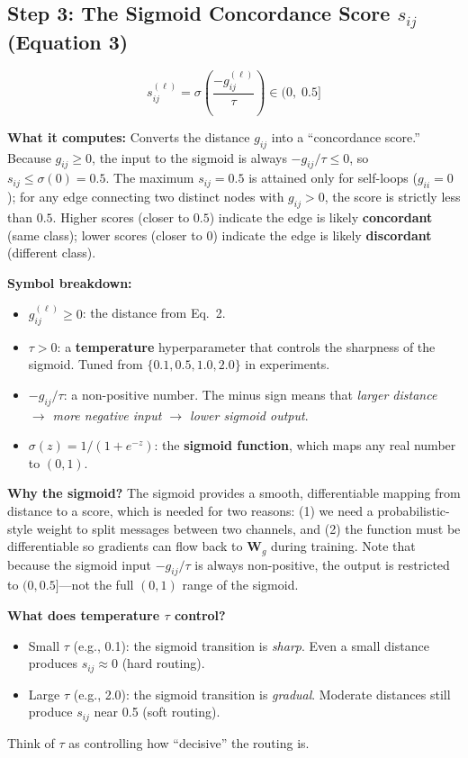 \documentclass[11pt,a4paper]{article}
\newcommand{\bW}{\mathbf{W}}
\theoremstyle{definition}
\theoremstyle{plain}
\begin{document}
\subsection{Step 3: The Sigmoid Concordance Score $s_{ij}$ (Equation 3)}
\label{sec:concordance}

\begin{equation}
  s_{ij}^{(\ell)} = \sigma\!\left(\frac{-g_{ij}^{(\ell)}}{\tau}\right) \in (0,\; 0.5]
  \tag{Eq.~3}
\end{equation}

\textbf{What it computes:}
Converts the distance $g_{ij}$ into a ``concordance score.''
Because $g_{ij} \geq 0$, the input to the sigmoid is always $-g_{ij}/\tau \leq 0$,
so $s_{ij} \leq \sigma(0) = 0.5$.
The maximum $s_{ij} = 0.5$ is attained only for self-loops ($g_{ii} = 0$);
for any edge connecting two distinct nodes with $g_{ij} > 0$, the score is strictly
less than $0.5$.
Higher scores (closer to $0.5$) indicate the edge is likely \textbf{concordant}
(same class); lower scores (closer to $0$) indicate the edge is likely
\textbf{discordant} (different class).

\textbf{Symbol breakdown:}
\begin{itemize}
  \item $g_{ij}^{(\ell)} \geq 0$: the distance from Eq.~2.
  \item $\tau > 0$: a \textbf{temperature} hyperparameter that controls the
    sharpness of the sigmoid.
    Tuned from $\{0.1, 0.5, 1.0, 2.0\}$ in experiments.
  \item $-g_{ij}/\tau$: a non-positive number. The minus sign means that
    \emph{larger distance $\to$ more negative input $\to$ lower sigmoid output}.
  \item $\sigma(z) = 1/(1 + e^{-z})$: the \textbf{sigmoid function},
    which maps any real number to $(0, 1)$.
\end{itemize}

\textbf{Why the sigmoid?}
The sigmoid provides a smooth, differentiable mapping from distance to a score,
which is needed for two reasons:
(1) we need a probabilistic-style weight to split messages between two channels,
and (2) the function must be differentiable so gradients can flow back to $\bW_g$
during training.
Note that because the sigmoid input $-g_{ij}/\tau$ is always non-positive,
the output is restricted to $(0, 0.5]$---not the full $(0,1)$ range of the sigmoid.

\textbf{What does temperature $\tau$ control?}
\begin{itemize}[nosep]
  \item Small $\tau$ (e.g., 0.1): the sigmoid transition is \emph{sharp}.
    Even a small distance produces $s_{ij} \approx 0$ (hard routing).
  \item Large $\tau$ (e.g., 2.0): the sigmoid transition is \emph{gradual}.
    Moderate distances still produce $s_{ij}$ near 0.5 (soft routing).
\end{itemize}
Think of $\tau$ as controlling how ``decisive'' the routing is.
\end{document}
